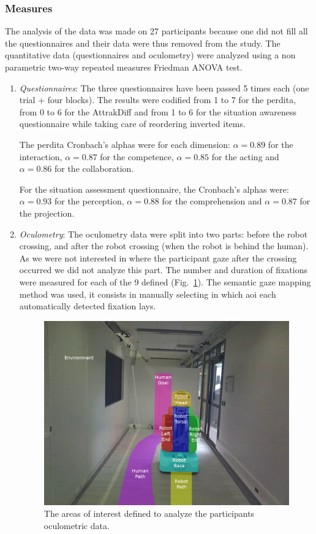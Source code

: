 \documentclass[a4paper,11pt,twoside]{StyleThese}
\begin{document}
\subsubsection{Measures}
The analysis of the data was made on 27 participants because one did not fill all the questionnaires and their data were thus removed from the study. The quantitative data (questionnaires and oculometry) were analyzed using a non parametric two-way repeated measures Friedman ANOVA test.
\begin{enumerate}


\item \textit{Questionnaires}:
The three questionnaires have been passed 5 times each (one trial + four blocks). The results were codified from 1 to 7 for the \acrshort{perdita}, from 0 to 6 for the AttrakDiff and from 1 to 6 for the situation awareness questionnaire while taking care of reordering inverted items.

The \acrshort{perdita} Cronbach's alphas were for each dimension: $\alpha = 0.89$ for the interaction, $\alpha = 0.87$ for the competence, $\alpha = 0.85$ for the acting and $\alpha = 0.86$ for the collaboration.

For the situation assessment questionnaire, the Cronbach's alphas were: $\alpha = 0.93$ for the perception, $\alpha = 0.88$ for the comprehension and $\alpha = 0.87$ for the projection.

\item \textit{Oculometry}:
The oculometry data were split into two parts: before the robot crossing, and after the robot crossing (when the robot is behind the human). As we were not interested in where the participant gaze after the crossing occurred we did not analyze this part. The number and duration of fixations were measured for each of the 9 defined  (Fig.~\ref{fig:aois}). The semantic gaze mapping method was used, it consists in manually selecting in which \acrshort{aoi} each automatically detected fixation lays.

\begin{figure}[hbtp]
\centering
\includegraphics[scale=0.4]{figures/chapter2/pr2_aois_2.png}
\caption{The areas of interest defined to analyze the participants oculometric data.}
\label{fig:aois}
\end{figure}


\end{enumerate}
\end{document}
